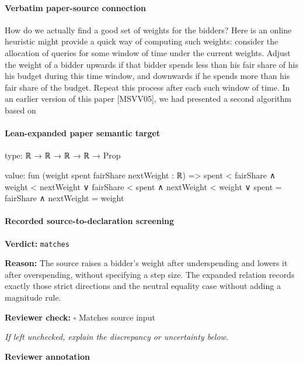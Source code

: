 \documentclass[10pt]{article}
\newcommand{\reviewerbox}{%
  \par\noindent\fbox{\parbox{0.96\linewidth}{\rule{0pt}{0.38in}}}\par
}
\newcommand{\reviewmatch}[1]{%
  \par\noindent\textbf{Reviewer check:} $\square$\; #1\par
  \noindent\emph{If left unchecked, explain the discrepancy or uncertainty below.}\par
}
\begin{document}
\paragraph{Verbatim paper-source connection}
\begin{ReviewVerbatim}
How do we actually find a good set of weights for the bidders? Here is an online heuristic
might provide a quick way of computing such weights: consider the allocation of queries for
some window of time under the current weights. Adjust the weight of a bidder upwards if
that bidder spends less than his fair share of his his budget during this time window, and
downwards if he spends more than his fair share of the budget. Repeat this process after each
such window of time.
In an earlier version of this paper [MSVV05], we had presented a second algorithm based on
\end{ReviewVerbatim}



\paragraph{Lean-expanded paper semantic target}
\begin{ReviewVerbatim}
type:
ℝ → ℝ → ℝ → ℝ → Prop

value:
fun (weight spent fairShare nextWeight : ℝ) =>
  spent < fairShare ∧ weight < nextWeight ∨
    fairShare < spent ∧ nextWeight < weight ∨ spent = fairShare ∧ nextWeight = weight
\end{ReviewVerbatim}


\paragraph{Recorded source-to-declaration screening}
\textbf{Verdict:} \texttt{matches}
\\
{\raggedright
\textbf{Reason:} The source raises a bidder's weight after underspending and lowers it after overspending, without specifying a step size.\allowbreak{} The expanded relation records exactly those strict directions and the neutral equality case without adding a magnitude rule.\allowbreak{}
\par}
\reviewmatch{Matches source input}
\noindent\textbf{Reviewer annotation}\par
\reviewerbox
\clearpage
\hypertarget{paper-prerequisite-eab5373dc7858bb2}{}
\end{document}
